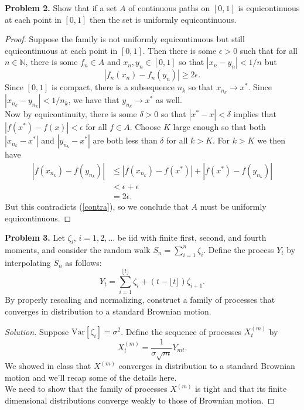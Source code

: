 \documentclass[11pt,letterpaper]{report}
\newcommand{\naturals}{\mathbb{N}}
\newcommand{\Var}{\text{Var}}
\newenvironment{solution}
{\begin{proof}[Solution]}
{\end{proof}}
\begin{document}
\noindent\textbf{Problem 2. }
Show that if a set $A$ of continuous paths on $[0,1]$ is equicontinuous at each point in $[0,1]$ then the set is uniformly equicontinuous.
\begin{proof}
	Suppose the family is not uniformly equicontinuous but still equicontinuous at each point in $[0,1]$. Then there is some $\epsilon>0$ such that for all $n\in \naturals$, there is some $f_n\in A$ and $x_n, y_n\in [0,1]$ so that $|x_n-y_n|<1/n$ but
	\begin{equation}\label{contra}
	|f_n(x_n)-f_n(y_n)|\geq 2\epsilon.
	\end{equation}
	Since $[0,1]$ is compact, there is a subsequence $n_k$ so that $x_{n_k}\to x^*$. Since $|x_{n_k} - y_{n_k}|<1/n_k$, we have that $y_{n_k}\to x^*$ as well.\\

	\noindent Now by equicontinuity, there is some $\delta>0$ so that $|x^*-x|<\delta$ implies that $|f(x^*)-f(x)|<\epsilon$ for all $f\in A$. Choose $K$ large enough so that both $|x_{n_k} - x^*|$ and $|y_{n_k} - x^*|$ are both less than $\delta$ for all $k>K$. For $k>K$ we then have
	\begin{align*}
		|f(x_{n_k}) - f(y_{n_k})| &\leq |f(x_{n_k}) - f(x^*)| + |f(x^*) - f(y_{n_k})|\\
		&< \epsilon + \epsilon\\
		&= 2\epsilon.
	\end{align*}
	But this contradicts (\ref{contra}), so we conclude that $A$ must be uniformly equicontinuous.
\end{proof}

\noindent\textbf{Problem 3. }
Let $\zeta_i$, $i = 1, 2, \ldots$ be iid with finite first, second, and fourth moments, and consider the random walk $S_n = \sum_{i=1}^n\zeta_i$. Define the process $Y_t$ by interpolating $S_n$ as follows:
\[
Y_t = \sum_{i=1}^{\lfloor t\rfloor}\zeta_i + (t - \lfloor t\rfloor)\zeta_{i+1}.
\]
By properly rescaling and normalizing, construct a family of processes that converges in distribution to a standard Brownian motion.
\begin{solution}
	Suppose $\Var[\zeta_i] = \sigma^2$. Define the sequence of processes $X^{(m)}_t$ by
	\[
	X^{(m)}_t = \frac{1}{\sigma\sqrt{m}}Y_{mt}.
	\]
	We showed in class that $X^{(m)}$ converges in distribution to a standard Brownian motion and we'll recap some of the details here.\\

	\noindent We need to show that the family of processes $X^{(m)}$ is tight and that its finite dimensional distributions converge weakly to those of Brownian motion. 
\end{solution}
\end{document}
